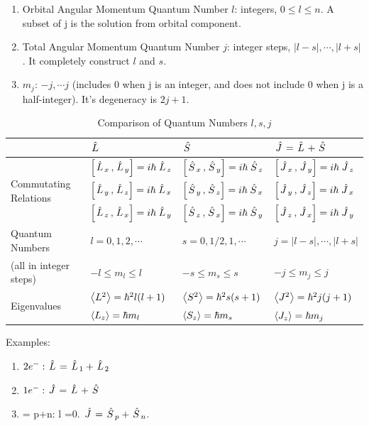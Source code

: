 \documentclass{school-22.101-notes}
\begin{document}
\begin{enumerate}
\item Orbital Angular Momentum Quantum Number $l$: integers, $0 \le l \le n$. A subset of j is the solution from orbital component. 
\item Total Angular Momentum Quantum Number $j$: integer steps, $|l-s|, \cdots, |l+s|$. It completely construct $l$ and $s$. 
\item $m_j$: $-j, \cdots j$ (includes 0 when j is an integer, and does not include 0 when j is a half-integer). It's degeneracy is $2j+1$. 
\end{enumerate}

\begin{table}[h!]
\begin{tabular}{|p{1.5in}|p{1.5in}|p{1.5in}|p{1.5in}|} \hline
 & $\left. \hat{L} \right.$ & $\left. \hat{S} \right.$ &$\left. \hat{J} \right. = \left. \hat{L} \right. + \left. \hat{S} \right.$ \\ \hline
\multirow{3}{*}{Commutating Relations} &
   $\left[ \left. \hat{L} \right._x, \left. \hat{L} \right._y \right] = i \hbar \left. \hat{L} \right._z$ &  $\left[ \left. \hat{S} \right._x, \left. \hat{S} \right._y \right] = i \hbar \left. \hat{S} \right._z$ &  $\left[ \left. \hat{J} \right._x, \left. \hat{J} \right._y \right] = i \hbar \left. \hat{J} \right._z$ \\
&  $\left[ \left. \hat{L} \right._y, \left. \hat{L} \right._z \right] = i \hbar \left. \hat{L} \right._x$ &  $\left[ \left. \hat{S} \right._y, \left. \hat{S} \right._z \right] = i \hbar \left. \hat{S} \right._x$ &  $\left[ \left. \hat{J} \right._y, \left. \hat{J} \right._z \right] = i \hbar \left. \hat{J} \right._x$ \\
&  $\left[ \left. \hat{L} \right._z, \left. \hat{L} \right._x \right] = i \hbar \left. \hat{L} \right._y$ &  $\left[ \left. \hat{S} \right._z, \left. \hat{S} \right._x \right] = i \hbar \left. \hat{S} \right._y$ &  $\left[ \left. \hat{J} \right._z, \left. \hat{J} \right._x \right] = i \hbar \left. \hat{J} \right._y$ \\ \hline
Quantum Numbers & $ l = 0,1,2,\cdots $ & $s = 0, 1/2, 1, \cdots$               & $ j =|l-s|,\cdots, |l+s|$ \\
(all in integer steps) & $-l \le m_l \le l  $  & $ -s \le m_s \le s$  & $-j \le m_j \le j$  \\ \hline
\multirow{2}{*}{Eigenvalues} 
& $\left< L^2 \right> = \hbar^2 l (l+1)$ 
& $\left< S^2 \right> = \hbar^2 s (s+1)$
& $\left< J^2 \right> = \hbar^2 j(j+1)$\\ 
& $\left< L_z \right> = \hbar m_l$ 
& $\left< S_z \right> = \hbar m_s$ 
& $\left< J_z \right> =  \hbar m_j$  \\ \hline
\end{tabular}
\caption{Comparison of Quantum Numbers $l,s,j$}
\label{quantum-numbers}
\end{table}


Examples:
\begin{enumerate}
\item $2e^-: \left. \hat{L} \right. = \left. \hat{L} \right._1 + \left. \hat{L} \right._2 $ 
\item $ 1 e^-: \left. \hat{J} \right. = \left. \hat{L} \right. + \left. \hat{S} \right.$
\item {} = p+n: l =0. $\left. \hat{J} \right. = \left. \hat{S} \right._p + \left. \hat{S} \right._n$. 
\end{enumerate}
\end{document}
